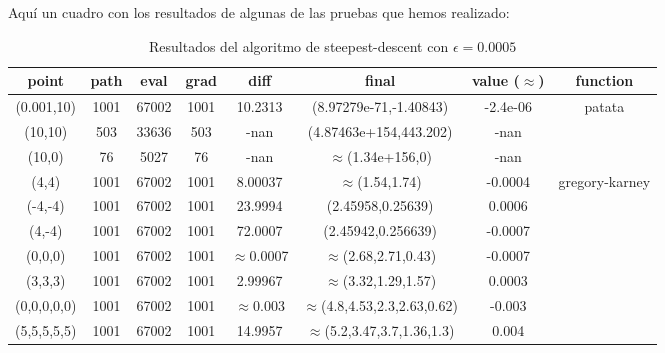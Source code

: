 Aquí un cuadro con los resultados de algunas de las pruebas que hemos realizado:

\begin{table}[H]
\hfill\begin{tabular}{|c|cccccc|c|}\hline
\bf point   & \bf path & \bf eval & \bf grad & \bf diff        & \bf final                         & \bf value ($\approx$) & \bf function                    \\\hline\hline
(0.001,10)  & 1001     & 67002    & 1001     & 10.2313         & (8.97279e-71,-1.40843)            & -2.4e-06              & \multirow{3}{*}{patata}         \\
(10,10)     & 503      & 33636    & 503      & -nan            & (4.87463e+154,443.202)            & -nan                  &                                 \\
(10,0)      & 76       & 5027     & 76       & -nan            & $\approx$(1.34e+156,0)            & -nan                  &                                 \\\hline\hline
(4,4)       & 1001     & 67002    & 1001     & 8.00037         & $\approx$(1.54,1.74)              & -0.0004               & \multirow{7}{*}{gregory-karney} \\
(-4,-4)     & 1001     & 67002    & 1001     & 23.9994         & (2.45958,0.25639)                 & 0.0006                &                                 \\
(4,-4)      & 1001     & 67002    & 1001     & 72.0007         & (2.45942,0.256639)                & -0.0007               &                                 \\
(0,0,0)     & 1001     & 67002    & 1001     & $\approx$0.0007 & $\approx$(2.68,2.71,0.43)         & -0.0007               &                                 \\
(3,3,3)     & 1001     & 67002    & 1001     & 2.99967         & $\approx$(3.32,1.29,1.57)         & 0.0003                &                                 \\
(0,0,0,0,0) & 1001     & 67002    & 1001     & $\approx$0.003  & $\approx$(4.8,4.53,2.3,2.63,0.62) & -0.003                &                                 \\
(5,5,5,5,5) & 1001     & 67002    & 1001     & 14.9957         & $\approx$(5.2,3.47,3.7,1.36,1.3)  & 0.004                 &                                 \\\hline
\end{tabular}\hfill\hbox{}
\caption{Resultados del algoritmo de steepest-descent con $\epsilon=0.0005$} \label{tab:steep}
\end{table}
\vspace{-1em}

